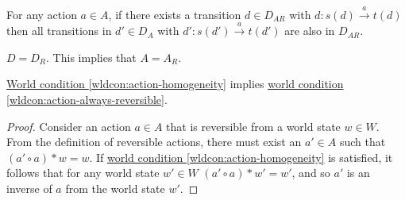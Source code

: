 \begin{world_condition}\label{wldcon:action-always-reversible}
    For any action $a \in A$, if there exists a transition $d \in D_{AR}$ with $d: s(d) \xrightarrow{a} t(d)$ then all transitions in $d' \in D_{A}$ with $d': s(d') \xrightarrow{a} t(d')$ are also in $D_{AR}$.

\end{world_condition}

\begin{world_condition}\label{wldcon:all-transitions-reversible}
    $D=D_{R}$.
    This implies that $A=A_{R}$.

\end{world_condition}

\begin{proposition}
    \hyperref[wldcon:action-homogeneity]{World condition \ref*{wldcon:action-homogeneity}} implies \hyperref[wldcon:action-always-reversible]{world condition \ref*{wldcon:action-always-reversible}}.
\end{proposition}
\begin{proof}
    Consider an action $a \in A$ that is reversible from a world state $w \in W$.
    From the definition of reversible actions, there must exist an $a' \in A$ such that $(a' \circ a) * w = w$.
    If \hyperref[wldcon:action-homogeneity]{world condition \ref*{wldcon:action-homogeneity}} is satisfied, it follows that for any world state $w' \in W$ $(a' \circ a) * w' = w'$, and so $a'$ is an inverse of $a$ from the world state $w'$.

\end{proof}



